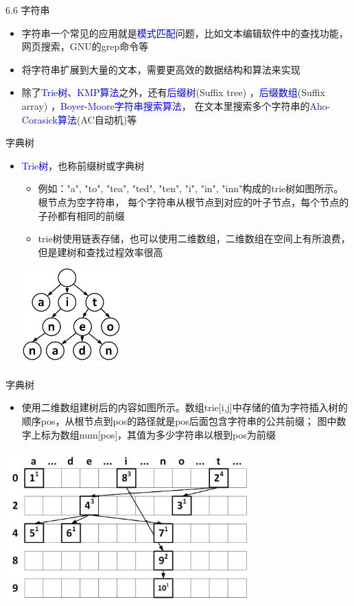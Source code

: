 \begin{frame}{6.6 字符串}
    \begin{itemize}
        \item 字符串一个常见的应用就是\textcolor{blue}{模式匹配}问题，比如文本编辑软件中的查找功能，网页搜索，GNU的grep命令等
        \vfill
        \item 将字符串扩展到大量的文本，需要更高效的数据结构和算法来实现
        \vfill
        \item 除了\textcolor{blue}{Trie树}、\textcolor{blue}{KMP算法}之外，还有\textcolor{blue}{后缀树}(Suffix tree) ，\textcolor{blue}{后缀数组}(Suffix array) ，\textcolor{blue}{Boyer-Moore字符串搜索算法}， 在文本里搜索多个字符串的\textcolor{blue}{Aho-Corasick算法}(AC自动机)等
    \end{itemize}
\end{frame}
\begin{frame}{字典树}
    \begin{itemize}
        \item \textcolor{blue}{Trie树}，也称前缀树或字典树
        \begin{itemize}
            \item 例如："a", "to", "tea", "ted", "ten", "i", "in", "inn"构成的trie树如图所示。根节点为空字符串， 每个字符串从根节点到对应的叶子节点，每个节点的子孙都有相同的前缀
            \item trie树使用链表存储，也可以使用二维数组，二维数组在空间上有所浪费，但是建树和查找过程效率很高
        \end{itemize}
        \includegraphics[width=0.3\textwidth,center]{fig/6-8.png}
    \end{itemize}
\end{frame}
\begin{frame}{字典树}
    \begin{itemize}
        \item 使用二维数组建树后的内容如图所示。数组trie[i,j]中存储的值为字符插入树的顺序pos，从根节点到pos的路径就是pos后面包含字符串的公共前缀； 图中数字上标为数组num[pos]，其值为多少字符串以根到pos为前缀
    \end{itemize}
    \includegraphics[width=0.7\textwidth,center]{fig/6-9.png}
\end{frame}
